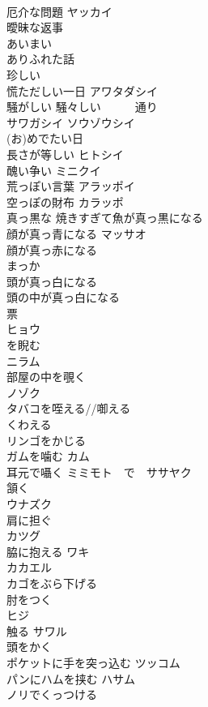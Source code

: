 \documentclass[8pt]{extreport}
\begin{document}
\begin{CJK}{UTF8}{min}
\\	厄介な問題	ヤッカイ 
\\	曖昧な返事	
\\	あいまい
\\	ありふれた話　
\\	珍しい	
\\	慌ただしい一日	アワタダシイ 
\\	騒がしい 騒々しい　　　通り	
\\	サワガシイ ソウゾウシイ
\\	(お)めでたい日	
\\	長さが等しい	ヒトシイ 
\\	醜い争い	ミニクイ 
\\	荒っぽい言葉	アラッポイ 
\\	空っぽの財布	カラッポ 
\\	真っ黒な 焼きすぎて魚が真っ黒になる	
\\	顔が真っ青になる	マッサオ 
\\	顔が真っ赤になる	
\\	まっか
\\	頭が真っ白になる	
\\	頭の中が真っ白になる	
\\	票	
\\	ヒョウ
\\	を睨む	
\\	ニラム
\\	部屋の中を覗く	
\\	ノゾク
\\	タバコを咥える//啣える	
\\	くわえる
\\	リンゴをかじる	
\\	ガムを噛む	カム 
\\	耳元で囁く	ミミモト　で　ササヤク 
\\	頷く	
\\	ウナズク
\\	肩に担ぐ	
\\	カツグ
\\	脇に抱える	ワキ
\\	カカエル 
\\	カゴをぶら下げる	
\\	肘をつく	
\\	ヒジ
\\	触る	サワル 
\\	頭をかく	
\\	ポケットに手を突っ込む	ツッコム 
\\	パンにハムを挟む	ハサム 
\\	ノリでくっつける	

\end{CJK}
\end{document}
